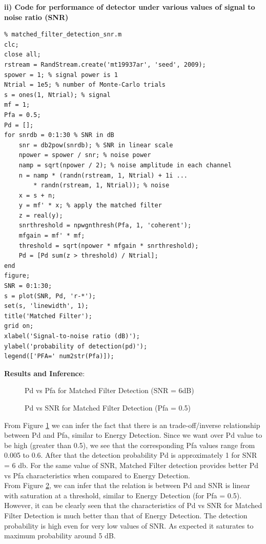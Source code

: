 \documentclass[a4paper]{article}
\begin{document}
\textbf{ii) Code for performance of detector under various values of signal to noise ratio (SNR)}\\
\begin{verbatim}
% matched_filter_detection_snr.m
clc;
close all;
rstream = RandStream.create('mt19937ar', 'seed', 2009);
spower = 1; % signal power is 1
Ntrial = 1e5; % number of Monte-Carlo trials
s = ones(1, Ntrial); % signal
mf = 1;
Pfa = 0.5;
Pd = [];
for snrdb = 0:1:30 % SNR in dB
    snr = db2pow(snrdb); % SNR in linear scale
    npower = spower / snr; % noise power
    namp = sqrt(npower / 2); % noise amplitude in each channel
    n = namp * (randn(rstream, 1, Ntrial) + 1i ...
        * randn(rstream, 1, Ntrial)); % noise
    x = s + n;
    y = mf' * x; % apply the matched filter
    z = real(y);
    snrthreshold = npwgnthresh(Pfa, 1, 'coherent');
    mfgain = mf' * mf;
    threshold = sqrt(npower * mfgain * snrthreshold);
    Pd = [Pd sum(z > threshold) / Ntrial];
end
figure;
SNR = 0:1:30;
s = plot(SNR, Pd, 'r-*');
set(s, 'linewidth', 1);
title('Matched Filter');
grid on;
xlabel('Signal-to-noise ratio (dB)');
ylabel('probability of detection(pd)');
legend(['PFA=' num2str(Pfa)]);
\end{verbatim}
\textbf{\large{Results and Inference}}:\\[10pt]
\begin{figure}[h!bt]
  \centering
  
  \caption{Pd vs Pfa for Matched Filter Detection (SNR = 6dB)}
  \label{fig:2.1}
\end{figure}
\begin{figure}[h!bt]
  \centering
  
  \caption{Pd vs SNR for Matched Filter Detection (Pfa = 0.5)}
  \label{fig:2.2}
\end{figure}
From Figure \ref{fig:2.1} we can infer the fact that there is an trade-off/inverse relationship between Pd and Pfa, similar to Energy Detection. Since we want over Pd value to be high (greater than 0.5), we see that the corresponding Pfa values range from 0.005 to 0.6. After that the detection probability Pd is approximately 1 for SNR = 6 db. For the same value of SNR, Matched Filter detection provides better Pd vs Pfa characteristics when compared to Energy Detection.\\[8pt]

From Figure \ref{fig:2.2}, we can infer that the relation is between Pd and SNR is linear with saturation at a threshold, similar to Energy Detection (for Pfa = 0.5). However, it can be clearly seen that the characteristics of Pd vs SNR for Matched Filter Detection is much better than that of Energy Detection. The detection probability is high even for very low values of SNR. As expected it saturates to maximum probability around 5 dB.\\
\end{document}
